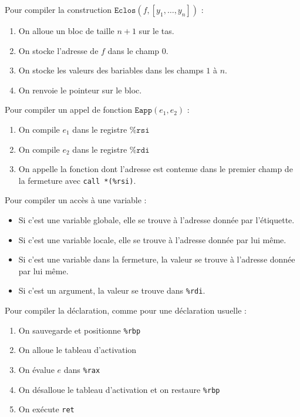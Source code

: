 \documentclass{cours}
\begin{document}
Pour compiler la construction $\texttt{Eclos}(f, [y_{1}, \ldots, y_{n}])$ :
\begin{enumerate}
    \item On alloue un bloc de taille $n + 1$ sur le tas.
    \item On stocke l'adresse de $f$ dans le champ $0$.
    \item On stocke les valeurs des bariables dans les champs $1$ à $n$.
    \item On renvoie le pointeur sur le bloc.
\end{enumerate}

Pour compiler un appel de fonction $\texttt{Eapp}(e_{1}, e_{2})$ :
\begin{enumerate}
    \item On compile $e_{1}$ dans le registre $\texttt{\%rsi}$
    \item On compile $e_{2}$ dans le registre $\texttt{\%rdi}$
    \item On appelle la fonction dont l'adresse est contenue dans le premier champ de la fermeture avec \texttt{call *(\%rsi)}.
\end{enumerate}

Pour compiler un accès à une variable :
\begin{itemize}
    \item Si c'est une variable globale, elle se trouve à l'adresse donnée par l'étiquette.
    \item Si c'est une variable locale, elle se trouve à l'adresse donnée par lui même.
    \item Si c'est une variable dans la fermeture, la valeur se trouve à l'adresse donnée par lui même.
    \item Si c'est un argument, la valeur se trouve dans \texttt{\%rdi}.
\end{itemize}

Pour compiler la déclaration, comme pour une déclaration usuelle :
\begin{enumerate}
    \item On sauvegarde et positionne \texttt{\%rbp}
    \item On alloue le tableau d'activation
    \item On évalue $e$ dans \texttt{\%rax}
    \item On désalloue le tableau d'activation et on restaure \texttt{\%rbp}
    \item On exécute \texttt{ret}
\end{enumerate}
\end{document}
